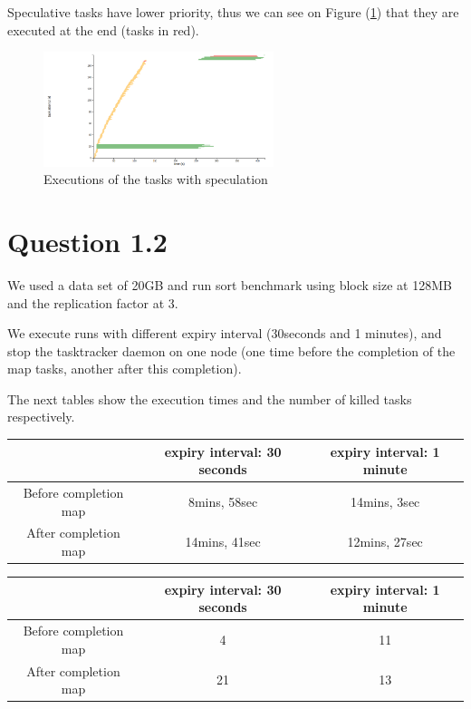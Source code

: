 \documentclass{article}
\begin{document}
Speculative tasks have lower priority, thus we can see on Figure (\ref{spec_prio}) that they are executed at the end (tasks in red).

\begin{figure}%
  \centering
  \includegraphics[width=0.6\textwidth]{spec.png}
  \caption{Executions of the tasks with speculation}
  \label{spec_prio}
\end{figure}


\section*{Question 1.2}

We used a data set of 20GB and run sort benchmark using block size at 128MB and the replication factor at 3.

We execute runs with different expiry interval (30seconds and 1 minutes), and stop the tasktracker daemon on one node (one time before the completion of the map tasks, another after this completion).

The next tables show the execution times and the number of killed tasks respectively.

\begin{center}
\begin{tabular}{|c|c|c|}
\hline
\ & expiry interval: 30 seconds & expiry interval: 1 minute \\
\hline
Before completion map & 8mins, 58sec & 14mins, 3sec \\
\hline
After completion map & 14mins, 41sec & 12mins, 27sec\\
\hline
\end{tabular}
\end{center}

\begin{center}
\begin{tabular}{|c|c|c|}
\hline
\ & expiry interval: 30 seconds & expiry interval: 1 minute \\
\hline
Before completion map & 4 & 11 \\
\hline
After completion map & 21 & 13 \\
\hline
\end{tabular}
\end{center}
\end{document}
